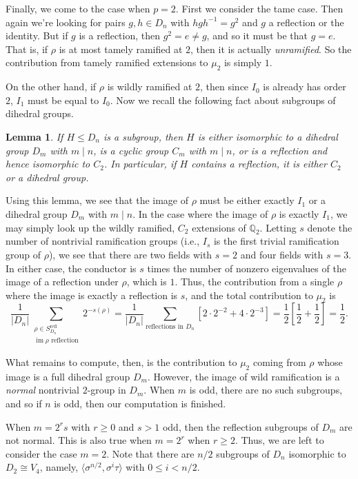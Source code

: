 \documentclass[11pt]{article}
\newcommand{\image}{\operatorname{im}}
\newcommand{\refl}{\mathrm{refl}}
\newcommand{\Q}{\mathbb{Q}}
\newtheorem{lem}{Lemma}[section]
\theoremstyle{definition}
\begin{document}
Finally, we come to the case when $p = 2$. First we consider the tame case.
Then again we're looking for pairs $g, h \in D_n$ with $hgh^{-1} = g^2$ and $g$
a reflection or the identity. But if $g$ is a reflection, then $g^2 = e \ne g$,
and so it must be that $g = e$. That is, if $\rho$ is at most tamely ramified
at $2$, then it is actually {\em unramified}. So the contribution from tamely
ramified extensions to $\mu_2$ is simply $1$.

On the other hand, if $\rho$ is wildly ramified at $2$, then since $I_0$ is
already has order $2$, $I_1$ must be equal to $I_0$. Now we recall the
following fact about subgroups of dihedral groups.

\begin{lem}
  If $H \leq D_n$ is a subgroup, then $H$ is either isomorphic to a dihedral
group $D_m$ with $m \mid n$, is a cyclic group $C_m$ with $m \mid n$, or is a
reflection and hence isomorphic to $C_2$. In particular, if $H$ contains a
reflection, it is either $C_2$ or a dihedral group.
\end{lem}

Using this lemma, we see that the image of $\rho$ must be either exactly $I_1$
or a dihedral group $D_m$ with $m \mid n$. In the case where the image of
$\rho$ is exactly $I_1$, we may simply look up the wildly ramified, $C_2$
extensions of $\Q_2$. Letting $s$ denote the number of nontrivial ramification
groups (i.e., $I_s$ is the first trivial ramification group of $\rho$), we see
that there are two fields with $s = 2$ and four fields with $s = 3$. In either
case, the conductor is $s$ times the number of nonzero eigenvalues of the image
of a reflection under $\rho$, which is $1$. Thus, the contribution from a single $\rho$ where the image is exactly a reflection is $s$, and the total contribution to $\mu_2$ is
\[ \frac{1}{|D_n|} \sum_{\substack{\rho \in S_{D_n}^\refl \\ \image \rho\text{ reflection}}} 2^{-s(\rho)}
 = \frac{1}{|D_n|} \sum_{\text{reflections in $D_n$}} \left[ 2 \cdot 2^{-2} + 4 \cdot 2^{-3} \right]
 = \frac{1}{2} \left[ \frac{1}{2} + \frac{1}{2} \right] = \frac{1}{2}. \]

What remains to compute, then, is the contribution to $\mu_2$ coming from
$\rho$ whose image is a full dihedral group $D_m$. However, the image of wild
ramification is a {\em normal} nontrivial $2$-group in $D_m$. When $m$ is odd,
there are no such subgroups, and so if $n$ is odd, then our computation is
finished.

When $m = 2^r s$ with $r \geq 0$ and $s > 1$ odd, then the reflection subgroups
of $D_m$ are not normal. This is also true when $m = 2^r$ when $r \geq 2$.
Thus, we are left to consider the case $m = 2$. Note that there are $n/2$
subgroups of $D_n$ isomorphic to $D_2 \cong V_4$, namely, $\langle
\sigma^{n/2}, \sigma^i\tau \rangle$ with $0 \leq i < n/2$.
\end{document}
